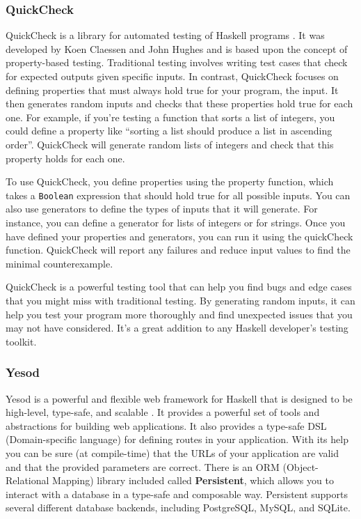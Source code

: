 \documentclass[a4paper, titlepage, twoside]{article}
\begin{document}
\subsubsection{QuickCheck}
\label{sec:orgb915471}

QuickCheck is a library for automated testing of Haskell programs \autocite{claessenQuickCheckAutomaticTesting}. It was developed by Koen Claessen and John Hughes and is based upon the concept of property-based testing. Traditional testing involves writing test cases that check for expected outputs given specific inputs. In contrast, QuickCheck focuses on defining properties that must always hold true for your program, the input. It then generates random inputs and checks that these properties hold true for each one. For example, if you're testing a function that sorts a list of integers, you could define a property like ``sorting a list should produce a list in ascending order''. QuickCheck will generate random lists of integers and check that this property holds for each one.

To use QuickCheck, you define properties using the property function, which takes a \texttt{Boolean} expression that should hold true for all possible inputs. You can also use generators to define the types of inputs that it will generate. For instance, you can define a generator for lists of integers or for strings. Once you have defined your properties and generators, you can run it using the quickCheck function. QuickCheck will report any failures and reduce input values to find the minimal counterexample.

QuickCheck is a powerful testing tool that can help you find bugs and edge cases that you might miss with traditional testing. By generating random inputs, it can help you test your program more thoroughly and find unexpected issues that you may not have considered. It's a great addition to any Haskell developer's testing toolkit.

\subsubsection{Yesod}
\label{sec:org84ab490}

Yesod is a powerful and flexible web framework for Haskell that is designed to be high-level, type-safe, and scalable \autocite{yesodYesodWebFramework2023}. It provides a powerful set of tools and abstractions for building web applications. It also provides a type-safe DSL (Domain-specific language) for defining routes in your application. With its help you can be sure (at compile-time) that the URLs of your application are valid and that the provided parameters are correct. There is an ORM (Object-Relational Mapping) library included called \textbf{Persistent}, which allows you to interact with a database in a type-safe and composable way. Persistent supports several different database backends, including PostgreSQL, MySQL, and SQLite.
\end{document}
